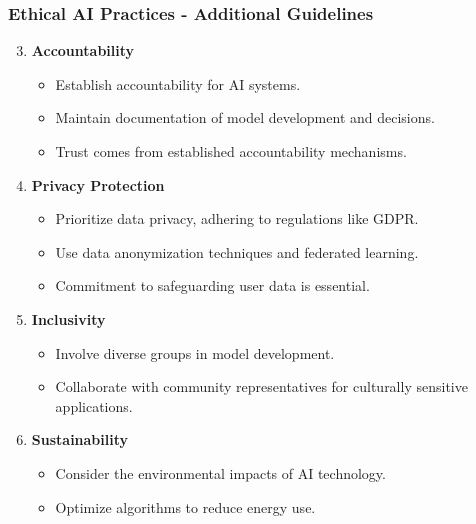 \documentclass[aspectratio=169]{beamer}
\begin{document}
\begin{frame}[fragile]
    \frametitle{Ethical AI Practices - Additional Guidelines}
    \begin{enumerate}
        \setcounter{enumi}{2}
        \item \textbf{Accountability}
            \begin{itemize}
                \item Establish accountability for AI systems.
                \item Maintain documentation of model development and decisions.
                \item Trust comes from established accountability mechanisms.
            \end{itemize}
        
        \item \textbf{Privacy Protection}
            \begin{itemize}
                \item Prioritize data privacy, adhering to regulations like GDPR.
                \item Use data anonymization techniques and federated learning.
                \item Commitment to safeguarding user data is essential.
            \end{itemize}

        \item \textbf{Inclusivity}
            \begin{itemize}
                \item Involve diverse groups in model development.
                \item Collaborate with community representatives for culturally sensitive applications.
            \end{itemize}

        \item \textbf{Sustainability}
            \begin{itemize}
                \item Consider the environmental impacts of AI technology.
                \item Optimize algorithms to reduce energy use.
            \end{itemize}
    \end{enumerate}
\end{frame}
\end{document}
